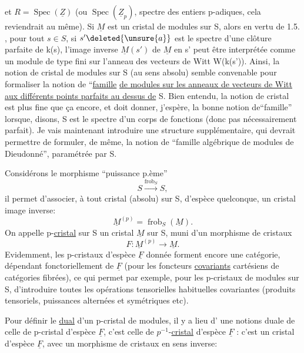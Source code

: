 
et $R=\operatorname{Spec}(\underline Z)$ (ou $\operatorname{Spec}(\underline Z_p)$, spectre des entiers p-adiques, cela reviendrait au même). Si $\underline M$ est un cristal de modules sur S,  alors en vertu de 1.5. , pour tout $s\in S$, si $s'\deleted{\unsure{a}}$ est le spectre d'une clôture parfaite de k(s), l'image inverse $\underline M(s')$ de $\underline M$ en s' peut être interprétée comme un module de type fini sur l'anneau des vecteurs de Witt W(k(s')). Ainsi, la notion de cristal de modules sur S (au sens absolu) semble convenable pour formaliser la notion de ``\uline{famille}  \uline{de modules sur les anneaux de vecteurs de Witt aux différents points parfaits au dessus de} S. Bien entendu, la notion de cristal est plus fine que ça encore, et doit donner, j'espère, la bonne notion de``famille'' lorsque, disons, S est le spectre d'un corps de fonctions (donc pas nécessairement parfait). Je vais maintenant introduire une structure supplémentaire, qui  devrait permettre de formuler, de même, la notion de ``famille algébrique de modules de Dieudonné'', paramétrée par S.

Considérons le morphisme ``puissance p.ème''
\[
S\xrightarrow{\operatorname{frob}_S}S,
\]
il permet d'associer, à tout cristal (absolu) sur S, d'espèce quelconque, un cristal image inverse:
\[
\underline M^{(p)}=\operatorname{frob}_S(\underline M).
\]
On appelle p-\uline{cristal} sur S un cristal $\underline M$ sur S, muni d'un morphisme de cristaux
\[
F:\underline M^{(p)}\longrightarrow\underline M.
\]
Evidemment, les p-cristaux  d'espèce $\underline F$ donnée forment encore une catégorie, dépendant fonctoriellement de $\underline F$ (pour les foncteurs \uline{covariants} cartésiens de catégories fibrées), ce qui permet par exemple, pour les p-cristaux de modules sur S, d'introduire toutes les opérations tensorielles habituelles covariantes (produits tensoriels, puissances alternées et symétriques etc).

Pour  définir le \uline{dual} d'un p-cristal de modules, il y a lieu d' une notions duale de celle de p-cristal d'espèce $\underline F$, c'est celle de $p^{-1}$-\uline{cristal} d'espèce $\underline F$ : c'est un cristal d'espèce $\underline F$, avec un morphisme de cristaux en sens inverse:
